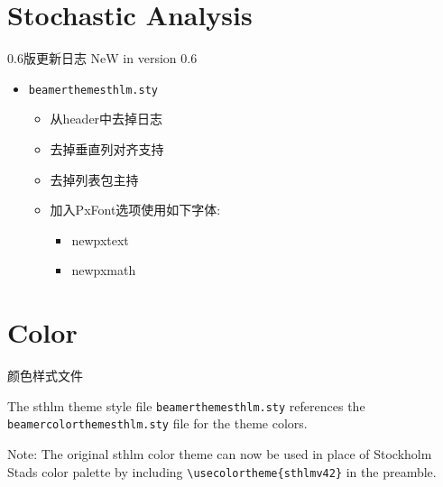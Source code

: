 \documentclass[newPxFont,sthlmFooter]{beamer}
\begin{document}
%
%

\section{Stochastic Analysis}


\begin{frame}[c]{0.6版更新日志}
\alert{NeW} in version 0.6

\begin{itemize}
	\item \texttt{beamerthemesthlm.sty}
	\begin{itemize}
		\item 从header中去掉日志
		\item 去掉垂直列对齐支持
		\item 去掉列表包主持
		\item 加入PxFont选项使用如下字体:
		\begin{itemize}
			\item newpxtext
			\item newpxmath
		\end{itemize}
	\end{itemize}
\end{itemize}
\end{frame}


%
%
\section{Color}


\begin{frame}[containsverbatim,c]{颜色样式文件}

The sthlm theme style file \texttt{beamerthemesthlm.sty} references the \texttt{beamercolorthemesthlm.sty} file for the theme colors.

\vspace{1em}

\begin{block}{Note:}
The original sthlm color theme can now be used in place of Stockholm Stads color palette by including \newline \lstinline!\usecolortheme{sthlmv42}! in the preamble.
\end{block}

\end{frame}
\end{document}
